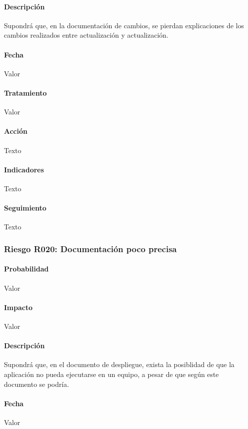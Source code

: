 \documentclass[10pt,a4paper]{article}
\begin{document}
				\paragraph{Descripción} Supondrá que, en la documentación de cambios, se pierdan explicaciones de los cambios realizados entre actualización y actualización.
				\paragraph{Fecha} Valor %
				\paragraph{Tratamiento} Valor %
				\paragraph{Acción} Texto %
				\paragraph{Indicadores} Texto %
				\paragraph{Seguimiento}	Texto %
				\subsubsection{Riesgo R020: Documentación poco precisa }
				\paragraph{Probabilidad} Valor
				\paragraph{Impacto}	Valor
				\paragraph{Descripción} Supondrá que, en el documento de despliegue, exista la posiblidad de que la aplicación no pueda ejecutarse en un equipo, a pesar de que según este documento se podría.

				\paragraph{Fecha} Valor %
\end{document}
